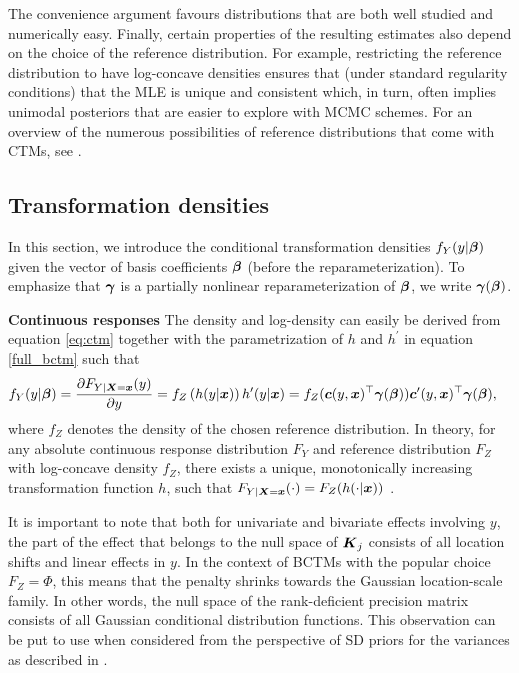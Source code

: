\documentclass[12pt]{article}
\theoremstyle{plain}
\begin{document}
The convenience argument favours distributions that are both well studied and numerically easy. Finally, certain properties of the resulting estimates also depend on the choice of the reference distribution. For example, restricting the reference distribution to have log-concave densities ensures that (under standard regularity conditions) that the MLE is unique and consistent which, in turn, often implies unimodal posteriors that are easier to explore with MCMC schemes. For an overview of the numerous possibilities of reference distributions that come with CTMs, see \cite{hothorn2018}.

\subsection{Transformation densities}\label{sec:trafo_ll}

In this section, we introduce the conditional transformation densities $f_Y(y|\text{\boldmath$\beta$})$ given the  vector of basis coefficients $\text{\boldmath$\beta$}$ (before the reparameterization). To emphasize that  $\text{\boldmath$\gamma$}$ is a partially nonlinear reparameterization of $\text{\boldmath$\beta$}$, we write $\text{\boldmath$\gamma$}(\text{\boldmath$\beta$})$.

\noindent\textbf{Continuous responses} The density and log-density can easily be derived from equation \eqref{eq:ctm} together with the parametrization of $h$ and $h^\prime$ in equation \eqref{full_bctm} such that
\begin{align}\label{cont_ll}
f_Y(y|\text{\boldmath$\beta$}) &= \frac{\partial F_{Y|\text{\boldmath$X$}={\text{\boldmath$x$}}}(y)}{\partial y} = f_Z\left(h(y|\text{\boldmath$x$})\right)h^\prime(y|\text{\boldmath$x$})  = f_Z(\text{\boldmath$c$}(y, \text{\boldmath$x$})^\top \text{\boldmath$\gamma$}(\text{\boldmath$\beta$}))\text{\boldmath$c$}^{\prime}(y, \text{\boldmath$x$})^\top \text{\boldmath$\gamma$}(\text{\boldmath$\beta$}),
\end{align}
where $f_Z$ denotes the density of the chosen reference distribution. In theory, for any absolute continuous response distribution $F_Y$ and reference distribution $F_Z$ with log-concave density $f_Z$, there exists a unique, monotonically increasing transformation function $h$, such that $F_{Y|\text{\boldmath$X$}=\text{\boldmath$x$}}(\cdot)=F_Z(h(\cdot|\text{\boldmath$x$}))$ \citep[see Cor.~1 of][]{hothorn2018}.

It is important to note that both for univariate and bivariate effects involving $y$, the part of the effect that belongs to the null space of $\text{\boldmath$K$}_j$ consists of all location shifts and linear effects in $y$. In the context of BCTMs with the popular choice $F_Z=\Phi$, this means that the penalty shrinks towards the Gaussian location-scale family. In other words, the null space of the rank-deficient precision matrix consists of all Gaussian conditional distribution functions. This observation can be put to use when considered from the perspective of SD priors for the variances as described in \cite{KleKne2016}.
\end{document}
